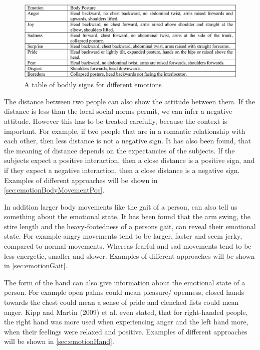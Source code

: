 \documentclass[conference]{IEEEtran}
\begin{document}
\begin{figure}[H]
\centering
   \includegraphics[width=\linewidth]{bodyPostureTable.jpg}
  \caption{A table of bodily signs for different emotions\cite{singhsignificance}}
  \label{fig:bodyPostureTable}
\end{figure}
The distance between two people can also show the attitude between them. If the distance is less than the local social norms permit, we can infer a negative attitude\cite{mehrabian1969significance}. However this has to be treated carefully, because the context is important. For example, if two people that are in a romantic relationship with each other, then less distance is not a negative sign. It has also been found, that the meaning of distance depends on the expectancies of the subjects. If the subjects expect a positive interaction, then a close distance is a positive sign, and if they expect a negative interaction, then a close distance is a negative sign\cite{mehrabian1969significance}. Examples of different approaches will be shown in \autoref{sec:emotionBodyMovementPos}.\

In addition larger body movements like the gait of a person, can also tell us something about the emotional state. It has been found that the arm swing, the stire length and the heavy-footedness of a persons gait, can reveal their emotional state\cite{montepare1987identification}. For example angry movements tend to be larger, faster and seem jerky, compared to normal movements\cite{singhsignificance}. Whereas fearful and sad movements tend to be less energetic, smaller and slower\cite{singhsignificance}. Examples of different approaches will be shown in \autoref{sec:emotionGait}.\


The form of the hand can also give information about the emotional state of a person. For example open palms could mean pleasure/ openness, closed hands towards the chest could mean a sense of pride and clenched fists could mean anger\cite{beale2008affect,singh2015edbl}. Kipp and Martin (2009) et al.\cite{kipp2009gesture} even stated, that for right-handed people, the right hand was more used when experiencing anger and the left hand more, when their feelings were relaxed and positive. Examples of different approaches will be shown in \autoref{sec:emotionHand}.
\end{document}
